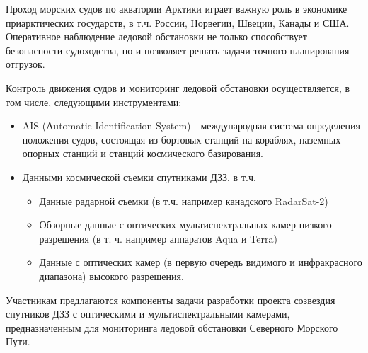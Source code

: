Проход морских судов по акватории Арктики играет важную роль в экономике приарктических государств, в т.ч. России, Норвегии, Швеции, Канады и США. Оперативное наблюдение ледовой обстановки не только способствует безопасности судоходства, но и позволяет решать задачи точного планирования отгрузок.


Контроль движения судов и мониторинг ледовой обстановки осуществляется, в том числе, следующими инструментами:
\begin{itemize}
    \item AIS (Аutomatic Identification System) - международная система определения положения судов, состоящая из бортовых станций на кораблях, наземных опорных станций и станций космического базирования.
    \item Данными космической съемки спутниками ДЗЗ, в т.ч.
    \begin{itemize}
        \item Данные радарной съемки (в т.ч. например канадского RadarSat-2)
        \item Обзорные данные с оптических мультиспектральных камер низкого разрешения (в т. ч. например аппаратов Aqua и Terra)
        \item Данные с оптических камер (в первую очередь видимого и инфракрасного диапазона) высокого разрешения.
    \end{itemize}
\end{itemize}

Участникам предлагаются компоненты задачи разработки проекта созвездия  спутников ДЗЗ с оптическими и мультиспектральными камерами, предназначенным для мониторинга ледовой обстановки Северного Морского Пути.
